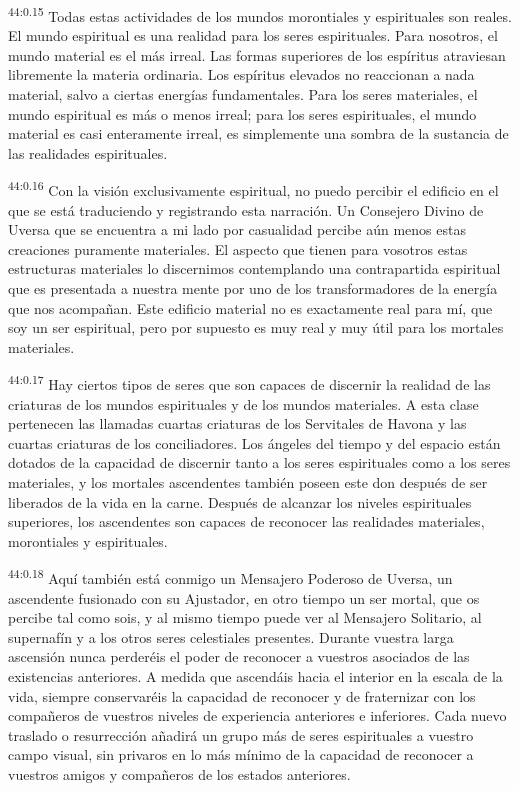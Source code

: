 \par
\textsuperscript{44:0.15} Todas estas actividades de los mundos morontiales y espirituales son reales. El mundo espiritual es una realidad para los seres espirituales. Para nosotros, el mundo material es el más irreal. Las formas superiores de los espíritus atraviesan libremente la materia ordinaria. Los espíritus elevados no reaccionan a nada material, salvo a ciertas energías fundamentales. Para los seres materiales, el mundo espiritual es más o menos irreal; para los seres espirituales, el mundo material es casi enteramente irreal, es simplemente una sombra de la sustancia de las realidades espirituales.

\par
\textsuperscript{44:0.16} Con la visión exclusivamente espiritual, no puedo percibir el edificio en el que se está traduciendo y registrando esta narración. Un Consejero Divino de Uversa que se encuentra a mi lado por casualidad percibe aún menos estas creaciones puramente materiales. El aspecto que tienen para vosotros estas estructuras materiales lo discernimos contemplando una contrapartida espiritual que es presentada a nuestra mente por uno de los transformadores de la energía que nos acompañan. Este edificio material no es exactamente real para mí, que soy un ser espiritual, pero por supuesto es muy real y muy útil para los mortales materiales.

\par
\textsuperscript{44:0.17} Hay ciertos tipos de seres que son capaces de discernir la realidad de las criaturas de los mundos espirituales y de los mundos materiales. A esta clase pertenecen las llamadas cuartas criaturas de los Servitales de Havona y las cuartas criaturas de los conciliadores. Los ángeles del tiempo y del espacio están dotados de la capacidad de discernir tanto a los seres espirituales como a los seres materiales, y los mortales ascendentes también poseen este don después de ser liberados de la vida en la carne. Después de alcanzar los niveles espirituales superiores, los ascendentes son capaces de reconocer las realidades materiales, morontiales y espirituales.

\par
\textsuperscript{44:0.18} Aquí también está conmigo un Mensajero Poderoso de Uversa, un ascendente fusionado con su Ajustador, en otro tiempo un ser mortal, que os percibe tal como sois, y al mismo tiempo puede ver al Mensajero Solitario, al supernafín y a los otros seres celestiales presentes. Durante vuestra larga ascensión nunca perderéis el poder de reconocer a vuestros asociados de las existencias anteriores. A medida que ascendáis hacia el interior en la escala de la vida, siempre conservaréis la capacidad de reconocer y de fraternizar con los compañeros de vuestros niveles de experiencia anteriores e inferiores. Cada nuevo traslado o resurrección añadirá un grupo más de seres espirituales a vuestro campo visual, sin privaros en lo más mínimo de la capacidad de reconocer a vuestros amigos y compañeros de los estados anteriores.

